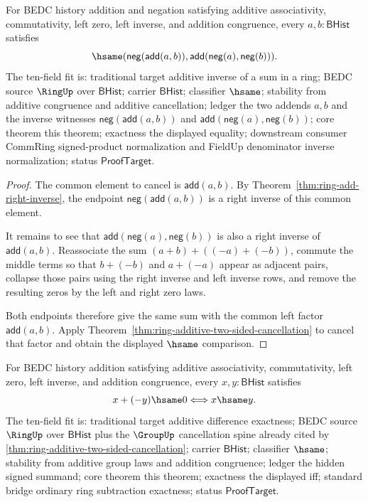 \begin{theorem}
\label{thm:ring-neg-add}
For BEDC history addition and negation satisfying additive associativity,
commutativity, left zero, left inverse, and addition congruence, every
$a,b:\mathsf{BHist}$ satisfies
$$
\hsame(\mathsf{neg}(\mathsf{add}(a,b)),
\mathsf{add}(\mathsf{neg}(a),\mathsf{neg}(b))).
$$
The ten-field fit is: traditional target additive inverse of a sum in a ring;
BEDC source $\RingUp$ over $\mathsf{BHist}$; carrier $\mathsf{BHist}$;
classifier $\hsame$; stability from additive congruence and additive
cancellation; ledger the two addends $a,b$ and the inverse witnesses
$\mathsf{neg}(\mathsf{add}(a,b))$ and
$\mathsf{add}(\mathsf{neg}(a),\mathsf{neg}(b))$; core theorem this theorem;
exactness the displayed equality; downstream consumer CommRing signed-product
normalization and FieldUp denominator inverse normalization; status
$\mathsf{ProofTarget}$.
\end{theorem}
\begin{proof}
The common element to cancel is $\mathsf{add}(a,b)$. By
Theorem~\ref{thm:ring-add-right-inverse}, the endpoint
$\mathsf{neg}(\mathsf{add}(a,b))$ is a right inverse of this common element.

It remains to see that
$\mathsf{add}(\mathsf{neg}(a),\mathsf{neg}(b))$ is also a right inverse of
$\mathsf{add}(a,b)$. Reassociate the sum
$(a+b)+((-a)+(-b))$, commute the middle terms so that $b+(-b)$ and
$a+(-a)$ appear as adjacent pairs, collapse those pairs using the right
inverse and left inverse rows, and remove the resulting zeros by the left and
right zero laws.

Both endpoints therefore give the same sum with the common left factor
$\mathsf{add}(a,b)$. Apply
Theorem~\ref{thm:ring-additive-two-sided-cancellation} to cancel that factor
and obtain the displayed $\hsame$ comparison.
\end{proof}

\begin{theorem}
\label{thm:ring-additive-difference-zero-exact}
For BEDC history addition satisfying additive associativity, commutativity,
left zero, left inverse, and addition congruence, every
$x,y:\mathsf{BHist}$ satisfies
$$
x+(-y)\hsame0 \Longleftrightarrow x\hsame y.
$$
The ten-field fit is: traditional target additive difference exactness; BEDC
source $\RingUp$ over $\mathsf{BHist}$ plus the $\GroupUp$ cancellation spine
already cited by \autoref{thm:ring-additive-two-sided-cancellation}; carrier
$\mathsf{BHist}$; classifier $\hsame$; stability from additive group laws and
addition congruence; ledger the hidden signed summand; core theorem this
theorem; exactness the displayed iff; standard bridge ordinary ring subtraction
exactness; status $\mathsf{ProofTarget}$.
\end{theorem}

